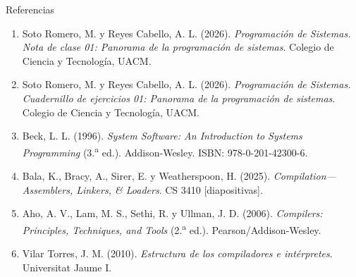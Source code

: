 \documentclass[11pt,spanish]{beamer}
\begin{document}
\begin{frame}{Referencias}
\vfill

\scriptsize
\begin{enumerate}
\item Soto Romero, M. y Reyes Cabello, A. L. (2026). \textit{Programación de Sistemas. Nota de clase 01: Panorama de la programación de sistemas}. Colegio de Ciencia y Tecnología, UACM.
\item Soto Romero, M. y Reyes Cabello, A. L. (2026). \textit{Programación de Sistemas. Cuadernillo de ejercicios 01: Panorama de la programación de sistemas}. Colegio de Ciencia y Tecnología, UACM.
\item Beck, L. L. (1996). \textit{System Software: An Introduction to Systems Programming} (3.\textsuperscript{a} ed.). Addison-Wesley. ISBN: 978-0-201-42300-6.
\item Bala, K., Bracy, A., Sirer, E. y Weatherspoon, H. (2025). \textit{Compilation---Assemblers, Linkers, \& Loaders}. CS 3410 [diapositivas].
\item Aho, A. V., Lam, M. S., Sethi, R. y Ullman, J. D. (2006). \textit{Compilers: Principles, Techniques, and Tools} (2.\textsuperscript{a} ed.). Pearson/Addison-Wesley.
\item Vilar Torres, J. M. (2010). \textit{Estructura de los compiladores e intérpretes}. Universitat Jaume I.
\end{enumerate}

\vfill
\end{frame}
\end{document}
